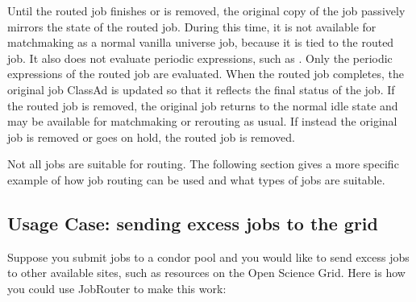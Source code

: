 Until the routed job finishes or is removed, the original copy of the
job passively mirrors the state of the routed job.  During this time,
it is not available for matchmaking as a normal vanilla universe job,
because it is tied to the routed job.  It also does not evaluate
periodic expressions, such as .  Only the periodic
expressions of the routed job are evaluated.  When the routed job
completes, the original job ClassAd is updated so that it reflects the
final status of the job.  If the routed job is removed, the original
job returns to the normal idle state and may be available for
matchmaking or rerouting as usual.  If instead the original job is
removed or goes on hold, the routed job is removed.

Not all jobs are suitable for routing.  The following section gives a
more specific example of how job routing can be used and what types of
jobs are suitable.

\subsection{Usage Case: sending excess jobs to the grid}

Suppose you submit jobs to a condor pool and you would like to send
excess jobs to other available sites, such as resources on the Open
Science Grid.  Here is how you could use JobRouter to make this work:

